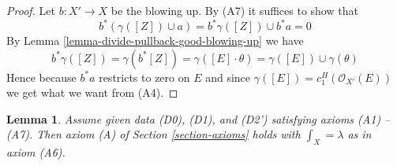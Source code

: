 \documentclass{stacks-project}
\theoremstyle{plain}
\newtheorem{lemma}[subsection]{Lemma}
\theoremstyle{definition}
\theoremstyle{remark}
\numberwithin{equation}{subsection}
\begin{document}
\begin{proof}
Let $b : X' \to X$ be the blowing up. By (A7) it suffices to show
that
$$
b^*(\gamma([Z]) \cup a) = b^*\gamma([Z]) \cup b^*a = 0
$$
By Lemma \ref{lemma-divide-pullback-good-blowing-up} we have
$$
b^*\gamma([Z]) = \gamma(b^*[Z]) =
\gamma([E] \cdot \theta) =
\gamma([E]) \cup \gamma(\theta)
$$
Hence because $b^*a$ restricts to zero on $E$ and since
$\gamma([E]) = c^H_1(\mathcal{O}_{X'}(E))$ we get what we want from (A4).
\end{proof}

\begin{lemma}
\label{lemma-poincare-duality}
Assume given data (D0), (D1), and (D2') satisfying axioms (A1) -- (A7).
Then axiom (A) of Section \ref{section-axioms} holds with
$\int_X = \lambda$ as in axiom (A6).
\end{lemma}
\end{document}
